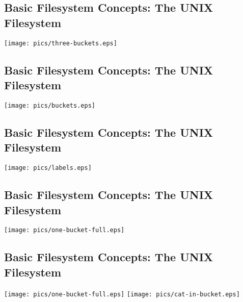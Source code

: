 \documentclass[xga]{xdvislides}
\begin{document}
\subsection{Basic Filesystem Concepts: The UNIX Filesystem}
\vspace*{\fill}
\begin{center}
\texttt{[image: pics/three-buckets.eps]} \\
\end{center}
\vspace*{\fill}

\subsection{Basic Filesystem Concepts: The UNIX Filesystem}
\vspace*{\fill}
\begin{center}
\texttt{[image: pics/buckets.eps]} \\
\end{center}
\vspace*{\fill}

\subsection{Basic Filesystem Concepts: The UNIX Filesystem}
\vspace*{\fill}
\begin{center}
\texttt{[image: pics/labels.eps]} \\
\end{center}
\vspace*{\fill}

\subsection{Basic Filesystem Concepts: The UNIX Filesystem}
\begin{center}
\texttt{[image: pics/one-bucket-full.eps]} \\
\end{center}

\subsection{Basic Filesystem Concepts: The UNIX Filesystem}
\vspace*{\fill}
\begin{center}
\texttt{[image: pics/one-bucket-full.eps]}
\hspace*{5mm}
\texttt{[image: pics/cat-in-bucket.eps]}
\end{center}
\vspace*{\fill}
\end{document}
